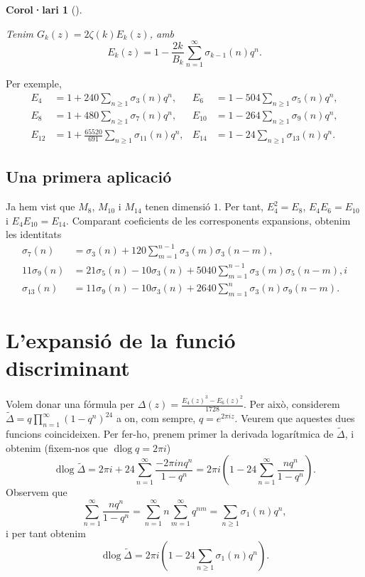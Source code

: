 \documentclass[
  letterpaper,
  DIV=11,
  numbers=noendperiod]{scrreprt}
\theoremstyle{plain}
\theoremstyle{plain}
\newtheorem{corollary}{Corol·lari}[chapter]
\theoremstyle{definition}
\theoremstyle{plain}
\theoremstyle{plain}
\theoremstyle{definition}
\theoremstyle{remark}
\begin{document}
\begin{corollary}[]\protect\hypertarget{cor-}{}\label{cor-}

Tenim \(G_k(z)=2\zeta(k)E_k(z)\), amb \[
E_k(z) = 1-\frac{2k}{B_k}\sum_{n=1}^\infty \sigma_{k-1}(n)q^n.
\]

\end{corollary}

Per exemple, \begin{align*}
E_4&=1+240\sum_{n\geq 1} \sigma_3(n)q^n,&
E_6&=1-504\sum_{n\geq 1} \sigma_5(n)q^n,\\
E_8&=1+480\sum_{n\geq 1} \sigma_7(n)q^n,&
E_{10} &= 1-264\sum_{n\geq 1}\sigma_9(n)q^n,\\
E_{12} &= 1+\frac{65520}{691}\sum_{n\geq 1}\sigma_{11}(n)q^n,&
E_{14} &= 1-24\sum_{n\geq 1} \sigma_{13}(n)q^n.
\end{align*}

\subsection{Una primera aplicació}\label{una-primera-aplicaciuxf3}

Ja hem vist que \(M_8\), \(M_{10}\) i \(M_{14}\) tenen dimensió \(1\).
Per tant, \(E_4^2=E_8\), \(E_4E_6=E_{10}\) i \(E_4E_{10}=E_{14}\).
Comparant coeficients de les corresponents expansions, obtenim les
identitats \begin{align*}
\sigma_7(n)&=\sigma_3(n)+120\sum_{m=1}^{n-1} \sigma_3(m)\sigma_3(n-m),\\
11\sigma_9(n)&=21\sigma_5(n)-10\sigma_3(n)+5040\sum_{m=1}^{n-1} \sigma_3(m)\sigma_5(n-m), i\\
\sigma_{13}(n) &= 11\sigma_9(n) - 10\sigma_{3}(n) +2640 \sum_{m=1}^n \sigma_3(n)\sigma_9(n-m).
\end{align*}

\section{L'expansió de la funció
discriminant}\label{lexpansiuxf3-de-la-funciuxf3-discriminant}

Volem donar una fórmula per
\(\Delta(z)=\frac{E_4(z)^3-E_6(z)^2}{1728}\). Per això, considerem
\(\tilde\Delta=q\prod_{n=1}^\infty(1-q^n)^{24}\) a on, com sempre,
\(q=e^{2\pi i z}\). Veurem que aquestes dues funcions coincideixen. Per
fer-ho, prenem primer la derivada logarítmica de \(\tilde\Delta\), i
obtenim (fixem-nos que \(\operatorname{dlog}q = 2\pi i\)) \[
\operatorname{dlog}\tilde\Delta = 2\pi i + 24\sum_{n=1}^\infty \frac{-2\pi i n q^n}{1-q^n} = 2\pi i\left(1-24\sum_{n=1}^\infty\frac{nq^n}{1-q^n}\right).
\] Observem que \[
\sum_{n=1}^\infty \frac{nq^n}{1-q^n}=\sum_{n=1}^\infty n\sum_{m=1}^\infty q^{nm} = \sum_{n\geq 1}\sigma_1(n)q^n,
\] i per tant obtenim \[
\operatorname{dlog}\tilde\Delta = 2\pi i \left( 1-24\sum_{n\geq 1} \sigma_1(n)q^n\right).
\]
\end{document}
